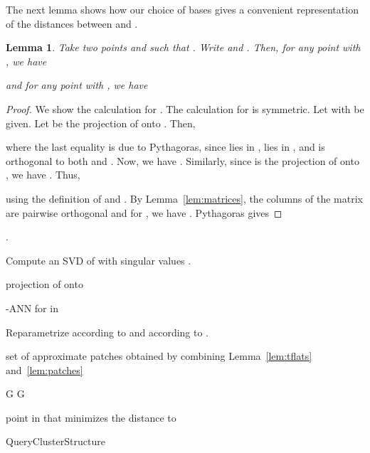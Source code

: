\documentclass[a4paper,11pt]{paper}
\newtheorem{lemma}[theorem]{Lemma}
\newenvironment{alg}{\begin{algorithm}[htbp]}{\end{algorithm}}
\begin{document}
The next lemma shows how our choice of bases gives a
convenient representation of the distances between  and
.
\begin{lemma}\label{lem:svddistance}
Take two points  and  such that
. Write  and
.
Then, for any point  with , we have

and for any point  with , we have

\end{lemma}
\begin{proof}
  We show the calculation for . The calculation for
   is symmetric. Let  with 
  be given. Let  be the projection of  onto .
  Then,
  
  where the last equality is due to Pythagoras, since
   lies in ,  lies in , and
   is orthogonal to both  and .
  Now,  we have
  . Similarly, since  is
  the projection of  onto , we have
  . Thus,
  
  using the definition of  and .
  By Lemma~\ref{lem:matrices}, the columns
   of the matrix
   are pairwise orthogonal and for
  , we have .
  Pythagoras gives
  
\end{proof}

\begin{alg}

  .

  Compute an SVD  of  with singular values
    .

  \If{} {

    projection of  onto 

      -ANN for  in 

     \Return 
  }

  Reparametrize  according to  and  according to .


   set of approximate patches obtained
    by combining Lemma~\ref{lem:tflats} and~\ref{lem:patches}

  

  \ForEach{} {
    G
  }
    G

  \Return point in  that minimizes the distance to 
 \caption{QueryClusterStructure}
 \label{alg:queryCluster}
\end{alg}
\end{document}

